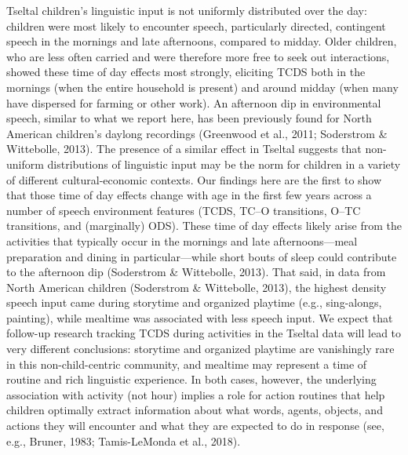 \documentclass[floatsintext,man]{apa6}
\theoremstyle{definition}
\theoremstyle{definition}
\theoremstyle{definition}
\theoremstyle{remark}
\begin{document}
Tseltal children's linguistic input is not uniformly distributed over
the day: children were most likely to encounter speech, particularly
directed, contingent speech in the mornings and late afternoons,
compared to midday. Older children, who are less often carried and were
therefore more free to seek out interactions, showed these time of day
effects most strongly, eliciting TCDS both in the mornings (when the
entire household is present) and around midday (when many have dispersed
for farming or other work). An afternoon dip in environmental speech,
similar to what we report here, has been previously found for North
American children's daylong recordings (Greenwood et al., 2011;
Soderstrom \& Wittebolle, 2013). The presence of a similar effect in
Tseltal suggests that non-uniform distributions of linguistic input may
be the norm for children in a variety of different cultural-economic
contexts. Our findings here are the first to show that those time of day
effects change with age in the first few years across a number of speech
environment features (TCDS, TC--O transitions, O--TC transitions, and
(marginally) ODS). These time of day effects likely arise from the
activities that typically occur in the mornings and late
afternoons---meal preparation and dining in particular---while short
bouts of sleep could contribute to the afternoon dip (Soderstrom \&
Wittebolle, 2013). That said, in data from North American children
(Soderstrom \& Wittebolle, 2013), the highest density speech input came
during storytime and organized playtime (e.g., sing-alongs, painting),
while mealtime was associated with less speech input. We expect that
follow-up research tracking TCDS during activities in the Tseltal data
will lead to very different conclusions: storytime and organized
playtime are vanishingly rare in this non-child-centric community, and
mealtime may represent a time of routine and rich linguistic experience.
In both cases, however, the underlying association with activity (not
hour) implies a role for action routines that help children optimally
extract information about what words, agents, objects, and actions they
will encounter and what they are expected to do in response (see, e.g.,
Bruner, 1983; Tamis-LeMonda et al., 2018).
\end{document}
